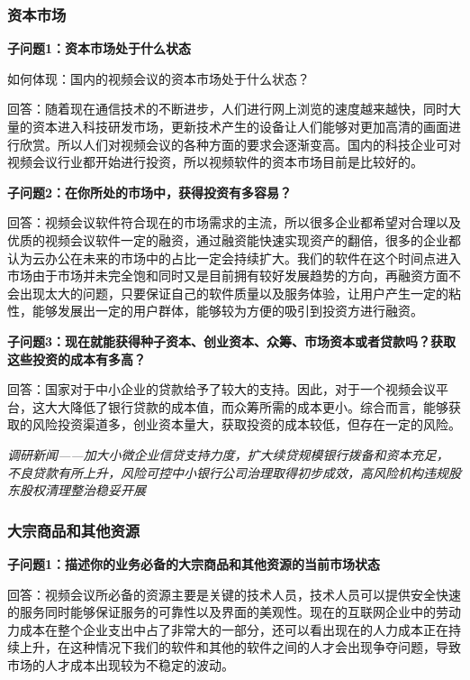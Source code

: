 \documentclass[a4paper,12pt]{article}
\begin{document}
    \subsubsection{资本市场}
    \textbf{子问题1：资本市场处于什么状态}

    如何体现：国内的视频会议的资本市场处于什么状态？

    回答：随着现在通信技术的不断进步，⼈们进⾏⽹上浏览的速度越来越快，同时⼤量的资本进⼊科技研发市场，更新技术产⽣的设备让⼈们能够对更加⾼清的画⾯进⾏欣赏。所以⼈们对视频会议的各种⽅⾯的要求会逐渐变⾼。国内的科技企业可对视频会议⾏业都开始进⾏投资，所以视频软件的资本市场⽬前是⽐较好的。
    
    \textbf{子问题2：在你所处的市场中，获得投资有多容易？}

    回答：视频会议软件符合现在的市场需求的主流，所以很多企业都希望对合理以及优质的视频会议软件⼀定的融资，通过融资能快速实现资产的翻倍，很多的企业都认为云办公在未来的市场中的占⽐⼀定会持续扩⼤。我们的软件在这个时间点进⼊市场由于市场并未完全饱和同时⼜是⽬前拥有较好发展趋势的⽅向，再融资⽅⾯不会出现太⼤的问题，只要保证⾃⼰的软件质量以及服务体验，让⽤户产⽣⼀定的粘性，能够发展出⼀定的⽤户群体，能够较为⽅便的吸引到投资⽅进⾏融资。

    \textbf{子问题3：现在就能获得种子资本、创业资本、众筹、市场资本或者贷款吗？获取这些投资的成本有多高？}

    回答：国家对于中⼩企业的贷款给予了较⼤的⽀持。因此，对于⼀个视频会议平台，这⼤⼤降低了银⾏贷款的成本值，⽽众筹所需的成本更⼩。综合⽽⾔，能够获取的⻛险投资渠道多，创业资本量⼤，获取投资的成本较低，但存在⼀定的风险。

    \textit{调研新闻——加⼤⼩微企业信贷⽀持⼒度，扩⼤续贷规模银⾏拨备和资本充⾜，不良贷款有所上升，风险可控中⼩银⾏公司治理取得初步成效，⾼⻛险机构违规股东股权清理整治稳妥开展}

    \textit{}

    \subsubsection{大宗商品和其他资源}
    \textbf{子问题1：描述你的业务必备的大宗商品和其他资源的当前市场状态}

    回答：视频会议所必备的资源主要是关键的技术⼈员，技术⼈员可以提供安全快速的服务同时能够保证服务的可靠性以及界⾯的美观性。现在的互联⽹企业中的劳动⼒成本在整个企业⽀出中占了⾮常⼤的⼀部分，还可以看出现在的⼈⼒成本正在持续上升，在这种情况下我们的软件和其他的软件之间的⼈才会出现争夺问题，导致市场的⼈才成本出现较为不稳定的波动。
\end{document}
